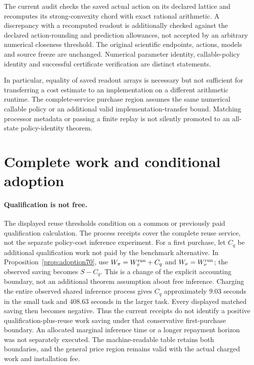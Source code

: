 The current audit checks the saved actual action on its declared lattice and recomputes its strong-convexity chord with exact rational arithmetic. A discrepancy with a recomputed readout is additionally checked against the declared action-rounding and prediction allowances, not accepted by an arbitrary numerical closeness threshold. The original scientific endpoints, actions, models and source freeze are unchanged. Numerical parameter identity, callable-policy identity and successful certificate verification are distinct statements.

In particular, equality of saved readout arrays is necessary but not sufficient for transferring a cost estimate to an implementation on a different arithmetic runtime. The complete-service purchase region assumes the same numerical callable policy or an additional valid implementation-transfer bound. Matching processor metadata or passing a finite replay is not silently promoted to an all-state policy-identity theorem.

\section{Complete work and conditional adoption}\label{supp:adoption70}

\paragraph{Qualification is not free.}
The displayed reuse thresholds condition on a common or previously paid qualification calculation. The process receipts cover the complete reuse service, not the separate policy-cost inference experiment. For a first purchase, let $C_q$ be additional qualification work not paid by the benchmark alternative. In Proposition~\ref{prop:adoption70}, use $W_\pi=W^{\rm run}_\pi+C_q$ and $W_\nu=W^{\rm run}_\nu$; the observed saving becomes $S-C_q$. This is a change of the explicit accounting boundary, not an additional theorem assumption about free inference. Charging the entire observed shared inference process gives $C_q$ approximately $9.03$ seconds in the small task and $408.63$ seconds in the larger task. Every displayed matched saving then becomes negative. Thus the current receipts do not identify a positive qualification-plus-reuse work saving under that conservative first-purchase boundary. An allocated marginal inference time or a longer repayment horizon was not separately executed. The machine-readable table retains both boundaries, and the general price region remains valid with the actual charged work and installation fee.

